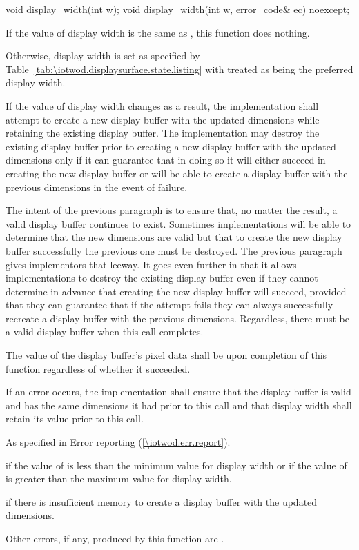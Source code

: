 %
\begin{itemdecl}
void display_width(int w);
void display_width(int w, error_code& ec) noexcept;
\end{itemdecl}
\begin{itemdescr}
\pnum
\effects
If the value of display width is the same as , this function does nothing.

\pnum
Otherwise, display width is set as specified by Table~\ref{tab:\iotwod.displaysurface.state.listing} with  treated as being the preferred display width.

\pnum
If the value of display width changes as a result, the implementation shall attempt to create a new display buffer with the updated dimensions while retaining the existing display buffer. The implementation may destroy the existing display buffer prior to creating a new display buffer with the updated dimensions only if it can guarantee that in doing so it will either succeed in creating the new display buffer or will be able to create a display buffer with the previous dimensions in the event of failure.

\pnum
\begin{note}
The intent of the previous paragraph is to ensure that, no matter the result, a valid display buffer continues to exist. Sometimes implementations will be able to determine that the new dimensions are valid but that to create the new display buffer successfully the previous one must be destroyed. The previous paragraph gives implementors that leeway. It goes even further in that it allows implementations to destroy the existing display buffer even if they cannot determine in advance that creating the new display buffer will succeed, provided that they can guarantee that if the attempt fails they can always successfully recreate a display buffer with the previous dimensions. Regardless, there must be a valid display buffer when this call completes.
\end{note}

\pnum
The value of the display buffer's pixel data shall be \unspecnorm upon completion of this function regardless of whether it succeeded.

\pnum
If an error occurs, the implementation shall ensure that the display buffer is valid and has the same dimensions it had prior to this call and that display width shall retain its value prior to this call.

\pnum
\throws
As specified in Error reporting (\ref{\iotwod.err.report}).

\pnum
\errors
{} if the value of  is less than the minimum value for display width or if the value of  is greater than the maximum value for display width.

\pnum
{} if there is insufficient memory to create a display buffer with the updated dimensions.

\pnum
Other errors, if any, produced by this function are .
\end{itemdescr}

